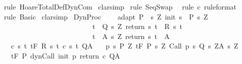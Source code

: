\begin{isabellebody}
\isamarkupfalse%
\ {\isacharparenleft}rule\ HoareTotalDef{\isachardot}DynCom{\isacharparenright}\isanewline
{}\isamarkupfalse%
\ clarsimp\isanewline
{}\isamarkupfalse%
\ {\isacharparenleft}rule\ SeqSwap{\isacharparenright}\isanewline
{}\isamarkupfalse%
\ \ {\isacharparenleft}rule\ c\ {\isacharbrackleft}rule{\isacharunderscore}format{\isacharbrackright}{\isacharparenright}\isanewline
{}\isamarkupfalse%
\ {\isacharparenleft}rule\ Basic{\isacharparenright}\isanewline
{}\isamarkupfalse%
\ clarsimp\isanewline
{}\isamarkupfalse%
%
\endisatagproof
{\isafoldproof}%
%
\isadelimproof
\isanewline
%
\endisadelimproof
\isanewline
{}\isamarkupfalse%
\ DynProc{\isacharprime}{\isacharcolon}\ \isanewline
\ \ \ adapt{\isacharcolon}\ {\isachardoublequoteopen}P\ {\isasymsubseteq}\ {\isacharbraceleft}s{\isachardot}\ {\isasymexists}Z{\isachardot}\ init\ s\ {\isasymin}\ P{\isacharprime}\ s\ Z\ {\isasymand}\isanewline
\ \ \ \ \ \ \ \ \ \ \ \ \ \ \ \ \ \ \ \ \ \ \ \ \ \ {\isacharparenleft}{\isasymforall}t\ {\isasymin}\ Q{\isacharprime}\ s\ Z{\isachardot}\ return\ s\ t\ {\isasymin}\ R\ s\ t{\isacharparenright}\ {\isasymand}\isanewline
\ \ \ \ \ \ \ \ \ \ \ \ \ \ \ \ \ \ \ \ \ \ \ \ \ \ {\isacharparenleft}{\isasymforall}t\ {\isasymin}\ A{\isacharprime}\ s\ Z{\isachardot}\ return\ s\ t\ {\isasymin}\ A{\isacharparenright}{\isacharbraceright}{\isachardoublequoteclose}\isanewline
\ \ \ c{\isacharcolon}\ {\isachardoublequoteopen}{\isasymforall}s\ t{\isachardot}\ {\isasymGamma}{\isacharcomma}{\isasymTheta}{\isasymturnstile}\isactrlsub t\isactrlbsub {\isacharslash}F\isactrlesub \ {\isacharparenleft}R\ s\ t{\isacharparenright}\ {\isacharparenleft}c\ s\ t{\isacharparenright}\ Q{\isacharcomma}A{\isachardoublequoteclose}\isanewline
\ \ \ p{\isacharcolon}\ {\isachardoublequoteopen}{\isasymforall}s{\isasymin}\ P{\isachardot}\ {\isasymforall}Z{\isachardot}\ {\isasymGamma}{\isacharcomma}{\isasymTheta}{\isasymturnstile}\isactrlsub t\isactrlbsub {\isacharslash}F\isactrlesub \ {\isacharparenleft}P{\isacharprime}\ s\ Z{\isacharparenright}\ Call\ {\isacharparenleft}p\ s{\isacharparenright}\ {\isacharparenleft}Q{\isacharprime}\ s\ Z{\isacharparenright}{\isacharcomma}{\isacharparenleft}A{\isacharprime}\ s\ Z{\isacharparenright}{\isachardoublequoteclose}\isanewline
\ \ \ {\isachardoublequoteopen}{\isasymGamma}{\isacharcomma}{\isasymTheta}{\isasymturnstile}\isactrlsub t\isactrlbsub {\isacharslash}F\isactrlesub \ P\ dynCall\ init\ p\ return\ c\ Q{\isacharcomma}A{\isachardoublequoteclose}\isanewline

\end{isabellebody}
